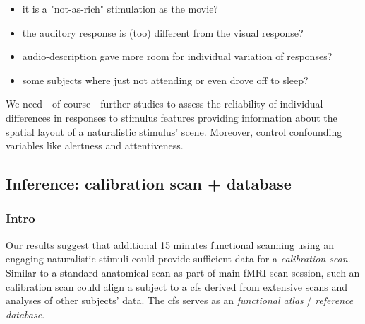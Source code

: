 \begin{itemize}

    \item it is a "not-as-rich" stimulation as the movie?

    \item the auditory response is (too) different from the visual response?

    \item audio-description gave more room for individual variation of
        responses?

    \item some subjects where just not attending or even drove off to sleep?

\end{itemize}
%
We need---of course---further studies to assess the reliability of individual
differences in responses to stimulus features providing information about the
spatial layout of a naturalistic stimulus' scene.
%
Moreover, control confounding variables like alertness and attentiveness.


\subsection{Inference: calibration scan + database}






\subsubsection{Intro}



%
Our results suggest that additional 15 minutes functional scanning using an
engaging naturalistic stimuli could provide sufficient data for a
\textit{calibration scan}.
%
Similar to a standard anatomical scan as part of main fMRI scan session, such an
calibration scan could align a subject to a \ac{cfs} derived from extensive
scans and analyses of other subjects' data.
%
The \ac{cfs} serves as an \textit{functional atlas} / \textit{reference
database}.


